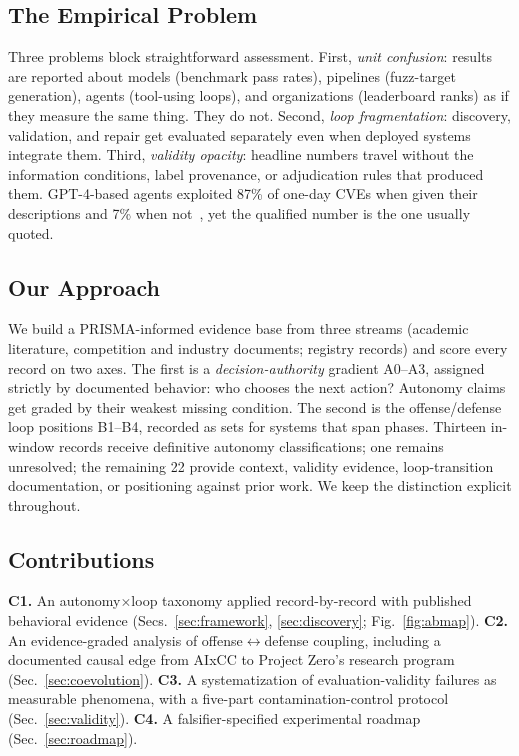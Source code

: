 \documentclass[conference,compsoc]{IEEEtran}
\begin{document}
\subsection{The Empirical Problem}
Three problems block straightforward assessment. First, \emph{unit confusion}: results are
reported about models (benchmark pass rates), pipelines (fuzz-target generation), agents
(tool-using loops), and organizations (leaderboard ranks) as if they measure the same thing.
They do not. Second, \emph{loop fragmentation}: discovery, validation, and repair get evaluated
separately even when deployed systems integrate them. Third, \emph{validity opacity}: headline
numbers travel without the information conditions, label provenance, or adjudication rules
that produced them. GPT-4-based agents exploited 87\% of one-day CVEs when given their
descriptions and 7\% when not~\cite{fang2024agents}, yet the qualified number is the one
usually quoted.

\subsection{Our Approach}
We build a PRISMA-informed evidence base from three streams (academic literature, competition and
industry documents; registry records) and score every record on two axes. The first is a
\emph{decision-authority} gradient A0--A3, assigned strictly by documented behavior: who
chooses the next action? Autonomy claims get graded by their weakest missing condition. The
second is the offense/defense loop positions B1--B4, recorded as sets for systems that span
phases. Thirteen in-window records receive definitive autonomy classifications; one remains
unresolved; the remaining 22 provide context, validity evidence, loop-transition
documentation, or positioning against prior work. We keep the distinction explicit throughout.

\subsection{Contributions}
\textbf{C1.} An autonomy$\times$loop taxonomy applied record-by-record with published
behavioral evidence (Secs.~\ref{sec:framework}, \ref{sec:discovery}; Fig.~\ref{fig:abmap}).
\textbf{C2.} An evidence-graded analysis of offense$\leftrightarrow$defense coupling, including
a documented causal edge from AIxCC to Project Zero's research
program (Sec.~\ref{sec:coevolution}).
\textbf{C3.} A systematization of evaluation-validity
failures as measurable phenomena, with a five-part contamination-control protocol
(Sec.~\ref{sec:validity}).
\textbf{C4.} A falsifier-specified experimental roadmap
(Sec.~\ref{sec:roadmap}).
\end{document}
